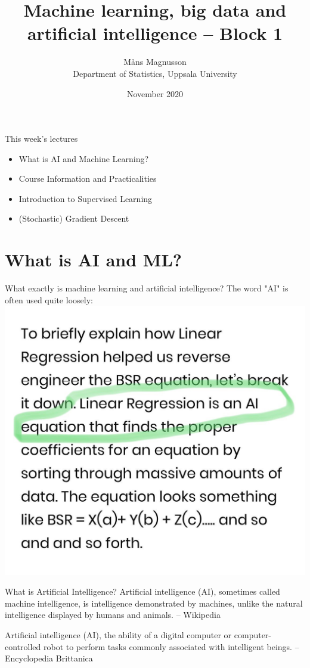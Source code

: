 \documentclass[10pt,handout]{beamer}
\title[]{{\color{black}Machine learning, big data and artificial intelligence -- Block 1}}
\author[]{M{\aa}ns Magnusson\\Department of Statistics, Uppsala University}
\date{November 2020}
\begin{document}
\frame{\titlepage
}



\begin{frame}{This week's lectures}
\begin{itemize}
\item What is AI and Machine Learning?
\item Course Information and Practicalities
\item Introduction to Supervised Learning
\item (Stochastic) Gradient Descent
\end{itemize}
\end{frame}

\section{What is AI and ML?}
\frame{\sectionpage}

\begin{frame}{What exactly is machine learning and artificial intelligence?}
The word "AI" is often used quite loosely:
   \includegraphics[width=\textwidth]{figs/AI-example.jpg}
\end{frame}


\begin{frame}{What is Artificial Intelligence?}
Artificial intelligence (AI), sometimes called machine intelligence, is intelligence demonstrated by machines, unlike the natural intelligence displayed by humans and animals. -- Wikipedia

Artificial intelligence (AI), the ability of a digital computer or computer-controlled robot to perform tasks commonly associated with intelligent beings. -- Encyclopedia Brittanica
\end{frame}
\end{document}
